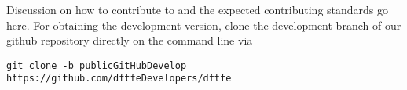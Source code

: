 Discussion on how to contribute to \dftfe{} and the expected contributing standards go here.
For obtaining the development version, clone the development branch of our github repository directly on the command line via
\begin{verbatim}
git clone -b publicGitHubDevelop https://github.com/dftfeDevelopers/dftfe
\end{verbatim}
